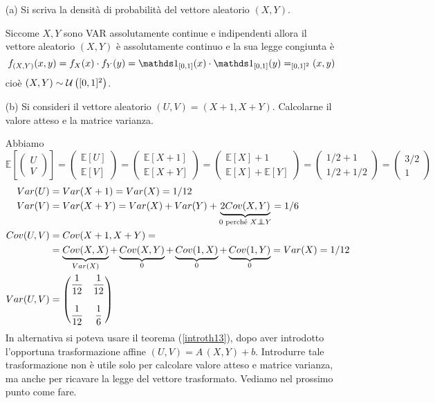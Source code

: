\Soluzione{}
\begin{enumerate}
\item [(a)] Si scriva la densità di probabilità del vettore aleatorio $(X,Y)$.

Siccome $X,Y$ sono VAR assolutamente continue e indipendenti allora il vettore aleatorio $(X,Y)$ è assolutamente continuo e la sua legge congiunta è
\[
\fXYxy=f_X(x)\cdot f_Y(y)=\Ind_{[0,1]}(x)\cdot \Ind_{[0,1]}(y)=_{[0,1]^2}(x,y)
\]
cioè $(X,Y)\sim\mathcal{U}\left([0,1]^2\right)$.

\item [(b)] Si consideri il vettore aleatorio $(U,V)=(X+1,X+Y)$. Calcolarne il valore atteso e la matrice varianza.

Abbiamo
\[
\mathbb{E}\left[\begin{pmatrix}
U \\ V
\end{pmatrix}\right] =
\begin{pmatrix}
\mathbb{E}[U] \\ \mathbb{E}[V]
\end{pmatrix} = 
\begin{pmatrix}
\mathbb{E}[X+1] \\ \mathbb{E}[X+Y]
\end{pmatrix} = 
\begin{pmatrix}
\mathbb{E}[X]+1 \\ \mathbb{E}[X] +\mathbb{E}[Y]
\end{pmatrix} =
\begin{pmatrix}
1/2+1 \\ 1/2+1/2
\end{pmatrix} = 
\begin{pmatrix}
3/2 \\ 1
\end{pmatrix}
\]
\begin{gather*}
\begin{aligned}
Var(U)&=Var(X+1)=Var(X)=1/12 \\
Var(V)&=Var(X+Y)=Var(X)+Var(Y)+\underbrace{2Cov(X,Y)}_{0\text{ perché }X\indep Y}=1/6 \\
Cov(U,V)&=Cov(X+1,X+Y)=\\
&=\underbrace{Cov(X,X)}_{Var(X)}+\underbrace{Cov(X,Y)}_{0}+\underbrace{Cov(1,X)}_{0}+\underbrace{Cov(1,Y)}_{0}=Var(X)=1/12 \\
Var(U,V)&=\begin{pmatrix}
 \dfrac{1}{12}& \dfrac{1}{12} \\
\, & \, \\
\dfrac{1}{12} &\dfrac{1}{6}  \\
\end{pmatrix}  
\end{aligned}
\end{gather*}
In alternativa si poteva usare il teorema (\ref{introth13}), dopo aver introdotto l'opportuna trasformazione affine $(U,V)=A\,(X,Y)+b$. Introdurre tale trasformazione non è utile solo per calcolare valore atteso e matrice varianza, ma anche per ricavare la legge del vettore trasformato. Vediamo nel prossimo punto come fare.


\end{enumerate}
